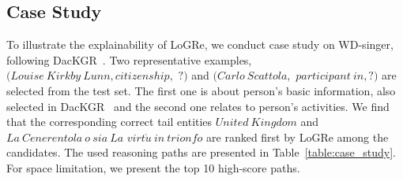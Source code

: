 \documentclass[sigconf]{acmart}
\begin{document}
\subsection{Case Study}
To illustrate the explainability of LoGRe, we conduct case study on WD-singer, following DacKGR~\cite{DacKGR}. Two representative examples, $(Louise\ Kirkby\ Lunn, citizenship,$ $?)$ and $(Carlo\ Scattola,$ $participant\ in, ?)$ are selected from the test set. The first one is about person's basic information, also selected in DacKGR~\cite{DacKGR} and the second one relates to person's activities. We find that the corresponding correct tail entities $United\ Kingdom$ and $La\ Cenerentola\ o\ sia\ La$ $virt\grave{u}\ in\ trionfo$ are ranked first by LoGRe among the candidates. The used reasoning paths are presented in Table~\ref{table:case_study}. For space limitation, we present the top 10 high-score paths.
\end{document}
